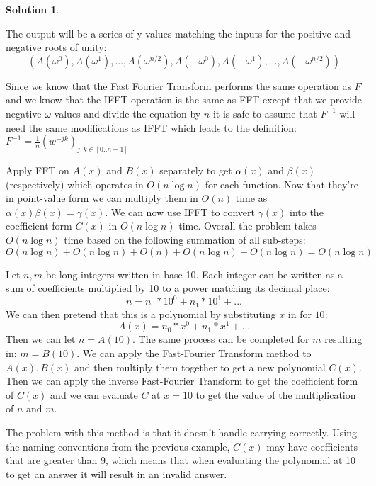 \documentclass{article}
\theoremstyle{definition}
\newtheorem*{solution}{Solution}
\begin{document}
\begin{solution}
\begin{compactenum}[(a)]
\item The output will be a series of y-values matching the inputs for the positive and negative roots of unity:
$$(A(\omega^0),A(\omega^1),...,A(\omega^{n/2}),A(-\omega^0),A(-\omega^1),...,A(-\omega^{n/2}))$$
\item Since we know that the Fast Fourier Transform performs the same operation as $F$ and we know that the IFFT operation is the same as FFT except that we provide negative $\omega$ values and divide the equation by $n$ it is safe to assume that $F^{-1}$ will need the same modifications as IFFT which leads to the definition: $F^{-1} = \frac{1}{n}(w^{-jk})_{j,k \in [0..n-1]}$
\item Apply FFT on $A(x)$ and $B(x)$ separately to get $\alpha(x)$ and $\beta(x)$ (respectively) which operates in $O(n\log n)$ for each function. Now that they're in point-value form we can multiply them in $O(n)$ time as $\alpha(x)\beta(x) = \gamma(x)$. We can now use IFFT to convert $\gamma(x)$ into the coefficient form $C(x)$ in $O(n\log n)$ time. Overall the problem takes $O(n \log n)$ time based on the following summation of all sub-steps:
$$O(n \log n) + O(n \log n) + O(n) + O(n \log n) + O(n \log n) = O(n \log n)$$
\item Let $n,m$ be long integers written in base 10. Each integer can be written as a sum of coefficients multiplied by 10 to a power matching its decimal place:
$$n = n_0 * 10^0 + n_1 * 10^1 + ...$$
We can then pretend that this is a polynomial by substituting $x$ in for $10$: 
$$A(x) = n_0 * x^0 + n_1 * x^1 + ...$$
Then we can let $n = A(10)$. The same process can be completed for $m$ resulting in: $m = B(10)$.
We can apply the Fast-Fourier Transform method to $A(x),B(x)$ and then multiply them together to get a new polynomial $C(x)$. Then we can apply the inverse Fast-Fourier Transform to get the coefficient form of $C(x)$ and we can evaluate $C$ at $x=10$ to get the value of the multiplication of $n$ and $m$.
\item The problem with this method is that it doesn't handle carrying correctly. Using the naming conventions from the previous example, $C(x)$ may have coefficients that are greater than 9, which means that when evaluating the polynomial at 10 to get an answer it will result in an invalid answer.
\end{compactenum}
\end{solution}
\end{document}

